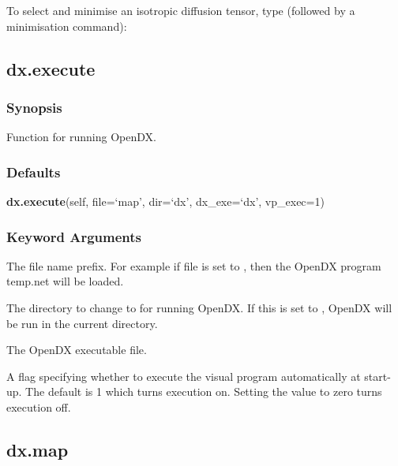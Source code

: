To select and minimise an isotropic diffusion tensor, type (followed by a minimisation command):





\newpage

\subsection{dx.execute}


\subsubsection{Synopsis}

Function for running OpenDX.



\subsubsection{Defaults}

\textsf{\textbf{dx.execute}(self, file=`map', dir=`dx', dx\_exe=`dx', vp\_exec=1)}


\subsubsection{Keyword Arguments}

  The file name prefix.  For example if file is set to , then the OpenDX program temp.net will be loaded. 

  The directory to change to for running OpenDX.  If this is set to , OpenDX will be run in the current directory. 

  The OpenDX executable file. 

  A flag specifying whether to execute the visual program automatically at start-up.  The default is 1 which turns execution on.  Setting the value to zero turns execution off. 





\newpage

\subsection{dx.map}



